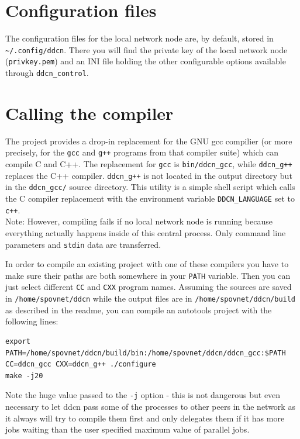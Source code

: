 \documentclass[a4paper,9pt]{scrartcl}
\begin{document}
\section{Configuration files}

The configuration files for the local network node are, by default, stored in \texttt{\textasciitilde/.config/ddcn}. There you will find the private key of the local network node (\texttt{privkey.pem}) and an INI file holding the other configurable options available through \texttt{ddcn\_control}.

\section{Calling the compiler}

The project provides a drop-in replacement for the GNU gcc compilier (or more precisely, for the \texttt{gcc} and \texttt{g++} programs from that compiler suite) which can compile C and C++. The replacement for \texttt{gcc} is \texttt{bin/ddcn\_gcc}, while \texttt{ddcn\_g++} replaces the C++ compiler. \texttt{ddcn\_g++} is not located in the output directory but in the \texttt{ddcn\_gcc/} source directory. This utility is a simple shell script which calls the C compiler replacement with the environment variable \texttt{DDCN\_LANGUAGE} set to \texttt{c++}.\\
Note: However, compiling fails if no local network node is running because everything actually happens inside of this central process. Only command line parameters and \texttt{stdin} data are transferred.\\
\smallskip

In order to compile an existing project with one of these compilers you have to make sure their paths are both somewhere in your \texttt{PATH} variable. Then you can just select different \texttt{CC} and \texttt{CXX} program names. Assuming the sources are saved in \texttt{/home/spovnet/ddcn} while the output files are in \texttt{/home/spovnet/ddcn/build} as described in the readme, you can compile an autotools project with the following lines:

\begin{verbatim}
export PATH=/home/spovnet/ddcn/build/bin:/home/spovnet/ddcn/ddcn_gcc:$PATH
CC=ddcn_gcc CXX=ddcn_g++ ./configure
make -j20
\end{verbatim} 

Note the huge value passed to the \texttt{-j} option - this is not dangerous but even necessary to let ddcn pass some of the processes to other peers in the network as it always will try to compile them first and only delegates them if it has more jobs waiting than the user specified maximum value of parallel jobs.
\end{document}
